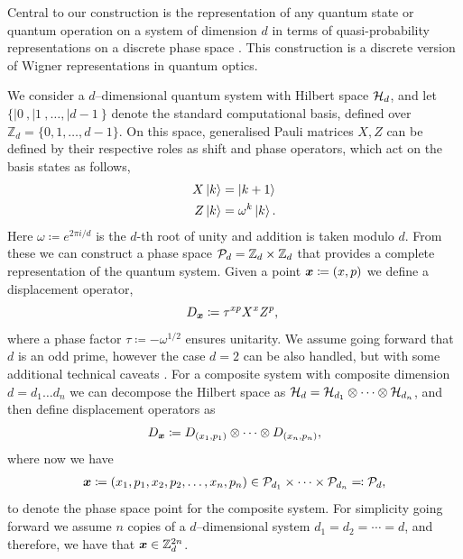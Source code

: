 \documentclass[pra,
aps,
twocolumn,
superscriptaddress,
groupedaddress,
nofootinbib,
reprint
]{revtex4-1}
\begin{document}
Central to our construction is the representation of any quantum state or quantum operation on a system of dimension $d$ in terms of quasi-probability representations on a discrete phase space . This construction is a discrete version of Wigner representations in quantum optics.

We consider a $d$--dimensional quantum system with Hilbert space $\H_d$, and let $\{ |0\>, |1\>, \dots , |d-1\>\}$ denote the standard computational basis, defined over $\mathbb{Z}_d = \{ 0, 1, \dots,d-1 \}$. On this space, generalised Pauli matrices $X, Z$ can be defined by their respective roles as shift and phase operators, which act on the basis states as follows,
\begin{align}
    X \ket{k} &= \ket{k + 1} \label{eq:xpauli}\\
	Z \ket{k} &= \omega^k \ket{k}. \label{eq:zpauli}
\end{align}
Here $\omega \coloneqq e^{2\pi i/d}$ is the $d$-th root of unity and addition is taken modulo $d$. From these we can construct a phase space $\cal{P}_d = \mathbb{Z}_d \times \mathbb{Z}_d$ that provides a complete representation of the quantum system. Given a point $\bmx \coloneqq (x, p)$ we define a displacement operator, 
\begin{equation}\label{eq:ddef}
    D_{\bmx} \coloneqq \tau^{x p} X^{x} Z^{p},\ 
\end{equation}
where a phase factor $\tau \coloneqq -\omega^{1/2}$ ensures unitarity. We assume going forward that $d$ is an odd prime, however the case $d=2$ can be also handled, but with some additional technical caveats \ddd{[CITE]}. For a composite system with composite dimension $d = d_1 \dots d_n$ we can decompose the Hilbert space as $\cal{H}_d = \cal{H}_{d_1} \otimes \dots \otimes \cal{H}_{d_n}$, and then define displacement operators as
\begin{equation}\label{eq:composited}
    D_{\bmx} \coloneqq D_{(x_1, p_1)} \otimes \dots \otimes D_{(x_n, p_n)},
\end{equation}
where now we have
\begin{align*}
	\bmx \coloneqq (x_1, p_1, x_2, p_2, \dots, x_n, p_n) \in \cal{P}_{d_1} \times \dots \times \cal{P}_{d_n} \eqqcolon  \cal{P}_d,
\end{align*}
to denote the phase space point for the composite system. For simplicity going forward we assume $n$ copies of a $d$--dimensional system $d_1=d_2 = \cdots = d$, and therefore, we have that $\x \in \mathbb{Z}_d^{2n}$.
\end{document}
